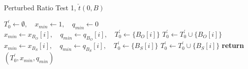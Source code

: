 \documentclass[a4paper]{article}
\begin{document}
\begin{algorithm}
\caption{Perturbed Ratio Test 1, $\check{t}(0, B)$}
\label{alg:ratio_test_step_1_0}
\begin{algorithmic}
\State $T_{0}^{\prime} \gets \emptyset,
  \quad x_{min} \gets 1, \quad  q_{min} \gets 0$
            \State $x_{min} \gets x_{B_{O}}[i],
	      \quad q_{min} \gets q_{B_{O}}[i],
	      \quad T_{0}^{\prime} \gets \{B_{O}[i]\}$
            \State $T_{0}^{\prime} \gets T_{0}^{\prime} \cup \{B_{O}[i]\}$	 
        \EndIf
    \EndIf
\EndFor
{}
            \State $x_{min} \gets x_{B_{S}}[i],
	      \quad q_{min} \gets q_{B_{S}}[i],
	      \quad T_{0}^{\prime} \gets \{B_{S}[i]\}$
            \State $T_{0}^{\prime} \gets T_{0}^{\prime} \cup \{B_{S}[i]\}$
	\EndIf	
    \EndIf 
\EndFor
\State \textbf{return} $(T_{0}^{\prime}, x_{min}, q_{min})$
\EndFunction
\end{algorithmic}
\end{algorithm}
\end{document}
